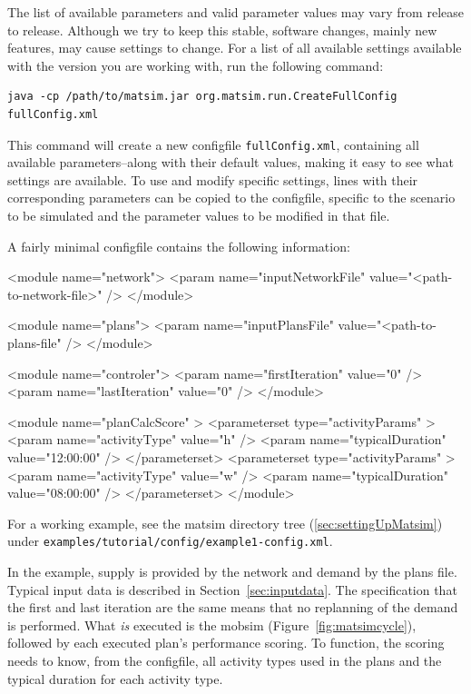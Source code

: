 The list of available parameters and valid parameter values may vary from release to release. Although we try to keep this stable,
software changes, mainly new features, may cause settings to change. For a list of all available settings available with the version you are working with, run the following command:
\begin{lstlisting}
java -cp /path/to/matsim.jar org.matsim.run.CreateFullConfig fullConfig.xml
\end{lstlisting}
%
This command will create a new \gls{configfile} \lstinline|fullConfig.xml|, containing all available parameters--along with their default values, making it easy to see what settings are available. To use and modify specific settings, lines with their corresponding parameters can be copied to the \gls{configfile}, specific to the \gls{scenario} to be simulated and the parameter values to be modified in that file. 

A fairly minimal \gls{configfile} contains the following information:
\begin{xml}
<module name="network">
   <param name="inputNetworkFile" value="<path-to-network-file>" />
</module>

<module name="plans">
   <param name="inputPlansFile" value="<path-to-plans-file" />
</module>

<module name="controler">
   <param name="firstIteration" value="0" />
   <param name="lastIteration" value="0" />
</module>

<module name="planCalcScore" >
   <parameterset type="activityParams" >
      <param name="activityType" value="h" />
      <param name="typicalDuration" value="12:00:00" />
   </parameterset>
   <parameterset type="activityParams" >
      <param name="activityType" value="w" />
      <param name="typicalDuration" value="08:00:00" />
   </parameterset>
</module>
\end{xml}
For a working example, see the \gls{matsim} directory tree (\cf \ref{sec:settingUpMatsim}) under \lstinline{examples/tutorial/config/example1-config.xml}.
 
In the example, supply is provided 
by the network and demand by the plans file. Typical input data is described in Section~\ref{sec:inputdata}. 
%
The specification that the first and last iteration are the same means that no \gls{replanning} of the demand is performed.  
%
What \emph{is} executed is the \gls{mobsim} (Figure~\ref{fig:matsimcycle}), followed by each executed plan's performance scoring.
%
To function, the scoring needs to know, from the \gls{configfile}, all activity types used in the plans and the typical duration for each activity type.

